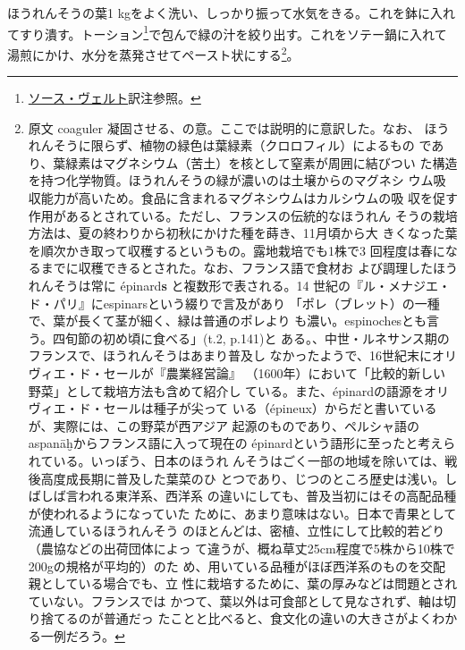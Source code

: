 \begin{recette}

ほうれんそうの葉1
kgをよく洗い、しっかり振って水気をきる。これを鉢に入れてすり潰す。トーション\footnote{\protect\hyperlink{sauce-verte}{ソース・ヴェルト}訳注参照。}で包んで緑の汁を絞り出す。これをソテー鍋に入れて湯煎にかけ、水分を蒸発させてペースト状にする\footnote{原文
  coaguler 凝固させる、の意。ここでは説明的に意訳した。なお、
  ほうれんそうに限らず、植物の緑色は葉緑素（クロロフィル）によるもの
  であり、葉緑素はマグネシウム（苦土）を核として窒素が周囲に結びつい
  た構造を持つ化学物質。ほうれんそうの緑が濃いのは土壌からのマグネシ
  ウム吸収能力が高いため。食品に含まれるマグネシウムはカルシウムの吸
  収を促す作用があるとされている。ただし、フランスの伝統的なほうれん
  そうの栽培方法は、夏の終わりから初秋にかけた種を蒔き、11月頃から大
  きくなった葉を順次かき取って収穫するというもの。露地栽培でも1株で3
  回程度は春になるまでに収穫できるとされた。なお、フランス語で食材お
  よび調理したほうれんそうは常に épinard\textbf{s}
  と複数形で表される。14
  世紀の『ル・メナジエ・ド・パリ』にespinarsという綴りで言及があり
  「ポレ（ブレット）の一種で、葉が長くて茎が細く、緑は普通のポレより
  も濃い。espinochesとも言う。四旬節の初め頃に食べる」(t.2, p.141)と
  ある。、中世・ルネサンス期のフランスで、ほうれんそうはあまり普及し
  なかったようで、16世紀末にオリヴィエ・ド・セールが『農業経営論』
  （1600年）において「比較的新しい野菜」として栽培方法も含めて紹介し
  ている。また、épinardの語源をオリヴィエ・ド・セールは種子が尖って
  いる（épineux）からだと書いているが、実際には、この野菜が西アジア
  起源のものであり、ペルシャ語のaspanāḫからフランス語に入って現在の
  épinardという語形に至ったと考えられている。いっぽう、日本のほうれ
  んそうはごく一部の地域を除いては、戦後高度成長期に普及した葉菜のひ
  とつであり、じつのところ歴史は浅い。しばしば言われる東洋系、西洋系
  の違いにしても、普及当初にはその高配品種が使われるようになっていた
  ために、あまり意味はない。日本で青果として流通しているほうれんそう
  のほとんどは、密植、立性にして比較的若どり（農協などの出荷団体によっ
  て違うが、概ね草丈25cm程度で5株から10株で200gの規格が平均的）のた
  め、用いている品種がほぼ西洋系のものを交配親としている場合でも、立
  性に栽培するために、葉の厚みなどは問題とされていない。フランスでは
  かつて、葉以外は可食部として見なされず、軸は切り捨てるのが普通だっ
  たことと比べると、食文化の違いの大きさがよくわかる一例だろう。}。


\end{recette}
